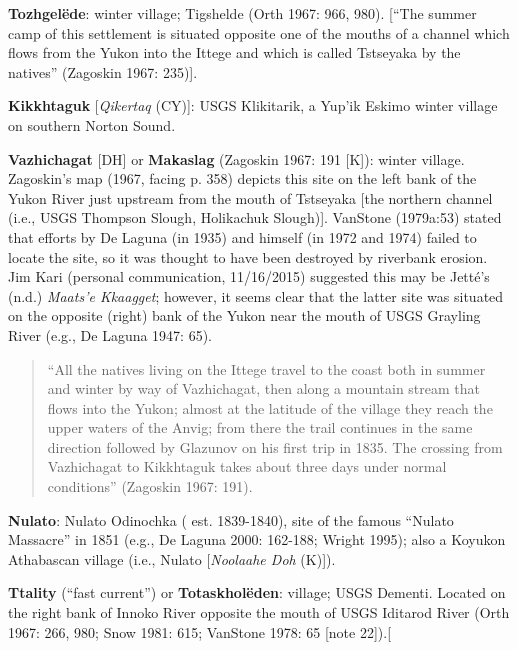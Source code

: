 \begin{hang}
\textbf{Tozhgelëde}: winter village; Tigshelde (Orth 1967: 966, 980). [“The summer camp of this settlement is situated opposite one of the mouths of a channel which flows from the Yukon into the Ittege and which is called Tstseyaka by the natives” (Zagoskin 1967: 235)].



\textbf{Kikkhtaguk} [\textit{Qikertaq} (CY)]: USGS Klikitarik, a Yup’ik Eskimo winter village on southern Norton Sound.



\textbf{Vazhichagat} [DH] or \textbf{Makaslag} (Zagoskin 1967: 191 [K]): winter village. Zagoskin’s map (1967, facing p. 358) depicts this site on the left bank of the Yukon River just upstream from the mouth of Tstseyaka [the northern channel (i.e., USGS Thompson Slough, Holikachuk Slough)]. VanStone (1979a:53) stated that efforts by De Laguna (in 1935) and himself (in 1972 and 1974) failed to locate the site, so it was thought to have been destroyed by riverbank erosion. Jim Kari (personal communication, 11/16/2015) suggested this may be Jetté’s (n.d.) \textit{Maats’e Kkaagget}; however, it seems clear that the latter site was situated on the opposite (right) bank of the Yukon near the mouth of USGS Grayling River (e.g., De Laguna 1947: 65).



\begin{quote}“All the natives living on the Ittege travel to the coast both in summer and winter by way of Vazhichagat, then along a mountain stream that flows into the Yukon; almost at the latitude of the village they reach the upper waters of the Anvig; from there the trail continues in the same direction followed by Glazunov on his first trip in 1835. The crossing from Vazhichagat to Kikkhtaguk takes about three days under normal conditions” (Zagoskin 1967: 191).
\end{quote}



\textbf{Nulato}: Nulato Odinochka ( est. 1839-1840), site of the famous “Nulato Massacre” in 1851 (e.g., De Laguna 2000: 162-188; Wright 1995); also a Koyukon Athabascan village (i.e., Nulato [\textit{Noolaahe Doh} (K)]).



\textbf{Ttality} (“fast current”) or \textbf{Totaskholëden}: village; USGS Dementi. Located on the right bank of Innoko River opposite the mouth of USGS Iditarod River (Orth 1967: 266, 980; Snow 1981: 615; VanStone 1978: 65 [note 22]).[




\end{hang}
